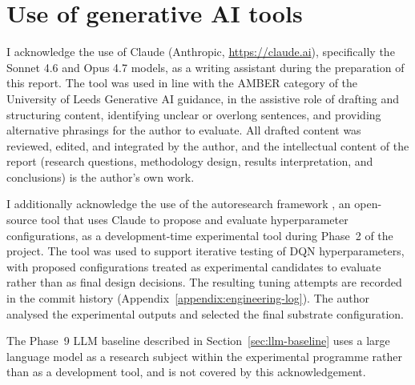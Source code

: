 \begin{appendices}
\begin{small}
\begin{verbatim}
\end{verbatim}
\end{small}

\chapter{Use of generative AI tools}
\label{appendix:genai}

I acknowledge the use of Claude (Anthropic, \url{https://claude.ai}), specifically the Sonnet 4.6 and Opus 4.7 models, as a writing assistant during the preparation of this report. The tool was used in line with the AMBER category of the University of Leeds Generative AI guidance, in the assistive role of drafting and structuring content, identifying unclear or overlong sentences, and providing alternative phrasings for the author to evaluate. All drafted content was reviewed, edited, and integrated by the author, and the intellectual content of the report (research questions, methodology design, results interpretation, and conclusions) is the author's own work.

I additionally acknowledge the use of the autoresearch framework \citep{karpathy2024autoresearch}, an open-source tool that uses Claude to propose and evaluate hyperparameter configurations, as a development-time experimental tool during Phase~2 of the project. The tool was used to support iterative testing of DQN hyperparameters, with proposed configurations treated as experimental candidates to evaluate rather than as final design decisions. The resulting tuning attempts are recorded in the commit history (Appendix~\ref{appendix:engineering-log}). The author analysed the experimental outputs and selected the final substrate configuration.

The Phase~9 LLM baseline described in Section~\ref{sec:llm-baseline} uses a large language model as a research subject within the experimental programme rather than as a development tool, and is not covered by this acknowledgement.
\end{appendices}
